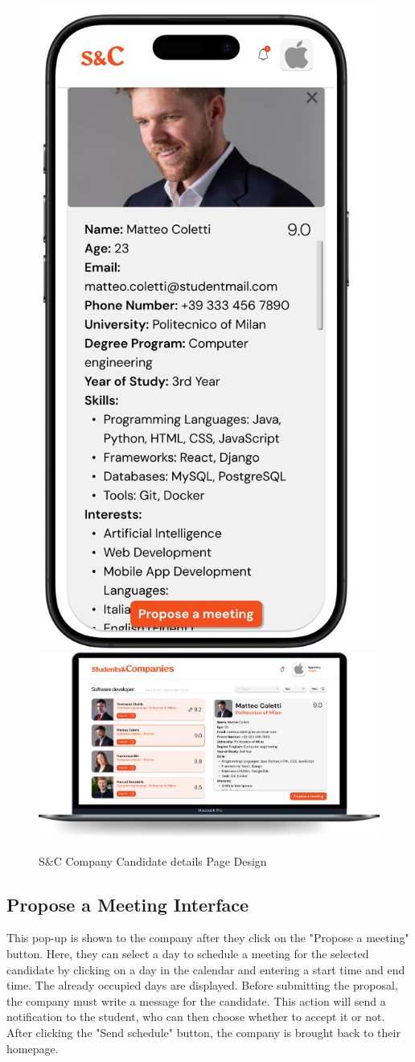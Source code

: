 \begin{figure}[H]
    \centering
    \includegraphics[width=0.2\linewidth]{Images/Mock-up/CandidateDetailsMobile.png}
    \includegraphics[width=0.75\linewidth]{Images/Mock-up/CandidateDetailsPC.png}
    \caption{S\&C Company Candidate details Page Design}
    \label{fig:homepage-design}
\end{figure}

\subsection{Propose a Meeting Interface}

This pop-up is shown to the company after they click on the "Propose a meeting" button. Here, they can select a day to schedule a meeting for the selected candidate by clicking on a day in the calendar and entering a start time and end time. The already occupied days are displayed. Before submitting the proposal, the company must write a message for the candidate. This action will send a notification to the student, who can then choose whether to accept it or not. After clicking the "Send schedule" button, the company is brought back to their homepage. \\

